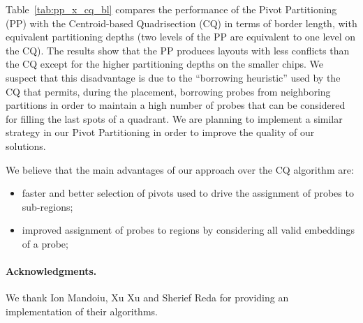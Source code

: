\documentclass{llncs}
\newcommand{\ignore}[1]{}
\begin{document}
\ignore{
Tables~\ref{tab:pp_affy_bl} and~\ref{tab:pp_affy_ci} shows the results of running PP on chips
containing probe sets of exisiting Affymetrix GeneChip arrays -- E.Coli 2.0 Genome (EC2), Porcine
Genome (POR) and Wheat Genome (WHT) -- whose probes are synchronously embedded in a deposition
sequence of length 74. Table~\ref{tab:pp_affy_bl} shows the normalized border length
(total border length divided by the number of probes) while Table~\ref{tab:pp_affy_ci} shows
the average conflict index.
} %

Table~\ref{tab:pp_x_cq_bl} compares the performance of the Pivot Partitioning (PP) with the
Centroid-based Quadrisection (CQ) in terms of border length, with equivalent partitioning
depths (two levels of the PP are equivalent to one level on the CQ). The results
show that the PP produces layouts with less conflicts than the CQ except for the higher
partitioning depths on the smaller chips. We suspect that this disadvantage is
due to the ``borrowing heuristic'' used by the CQ that permits, during the placement,
borrowing probes from neighboring partitions in order to maintain a high number
of probes that can be considered for filling the last spots of a quadrant. We are planning
to implement a similar strategy in our Pivot Partitioning in order to improve
the quality of our solutions.

We believe that the main advantages of our approach over the CQ algorithm are:
\begin{itemize}
\item faster and better selection of pivots used to drive
the assignment of probes to sub-regions;
\item improved assignment of probes to regions by considering all valid embeddings
of a probe;
\end{itemize}

\paragraph{Acknowledgments.}We thank Ion Mandoiu, Xu Xu and Sherief Reda for
providing an implementation of their algorithms.
\end{document}
